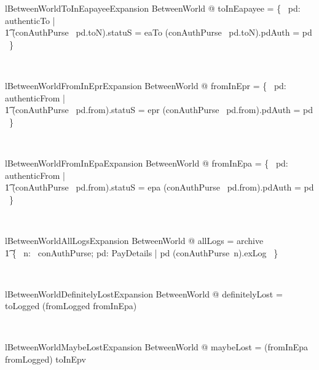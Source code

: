 \begin{LNewLemma}
\begin{theorem}{lBetweenWorldToInEapayeeExpansion}
    \forall  BetweenWorld @ toInEapayee = \{~ pd: authenticTo | \\
        \t1 (conAuthPurse~ pd.toN).statuS = eaTo \land (conAuthPurse~ pd.toN).pdAuth = pd ~\}
\end{theorem}~\end{LNewLemma}

\begin{LNewLemma}
\begin{theorem}{lBetweenWorldFromInEprExpansion}
    \forall  BetweenWorld @ fromInEpr = \{~  pd: authenticFrom | \\
        \t1 (conAuthPurse~ pd.from).statuS = epr \land (conAuthPurse~ pd.from).pdAuth = pd ~\}
\end{theorem}~\end{LNewLemma}

\begin{LNewLemma}
\begin{theorem}{lBetweenWorldFromInEpaExpansion}
    \forall  BetweenWorld @ fromInEpa = \{~  pd: authenticFrom | \\
        \t1 (conAuthPurse~ pd.from).statuS = epa \land  (conAuthPurse~ pd.from).pdAuth = pd ~\}
\end{theorem}~\end{LNewLemma}

\begin{LNewLemma}
\begin{theorem}{lBetweenWorldAllLogsExpansion}
    \forall  BetweenWorld @ allLogs = archive \cup \\
        \t1 \{~ n: \dom~conAuthPurse; pd: PayDetails | pd \in (conAuthPurse~n).exLog ~\}
\end{theorem}~\end{LNewLemma}

\begin{LNewLemma}
\begin{theorem}{lBetweenWorldDefinitelyLostExpansion}
    \forall BetweenWorld @ definitelyLost = toLogged \cap (fromLogged \cup  fromInEpa)
\end{theorem}~\end{LNewLemma}

\begin{LNewLemma}
\begin{theorem}{lBetweenWorldMaybeLostExpansion}
    \forall BetweenWorld @ maybeLost = (fromInEpa \cup  fromLogged) \cap  toInEpv
\end{theorem}~\end{LNewLemma}


